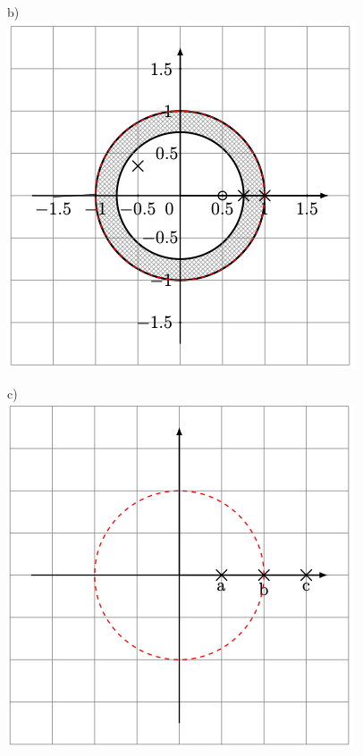 \documentclass[11pt]{article}
\begin{document}
\hfill
\begin{minipage}[t]{0.25\textwidth}
    b)\\
    \includegraphics[width=\linewidth]{docimgs/b.png}
\end{minipage}
\hfill
\begin{minipage}[t]{0.25\textwidth}
    c)\\
    \includegraphics[width=\linewidth]{docimgs/c.png}
\end{minipage}
\end{document}
